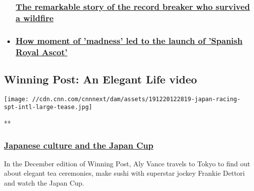 \begin{itemize}
{  \subsubsection{\texorpdfstring{\href{/2019/11/08/sport/belvoir-bay-fire-horse-california-winning-post-spt-intl/index.html}{The
  remarkable story of the record breaker who survived a
  wildfire}}{The remarkable story of the record breaker who survived a wildfire}}\label{the-remarkable-story-of-the-record-breaker-who-survived-a-wildfire}}
\item
  \hypertarget{how-moment-of-madness-led-to-the-launch-of-spanish-royal-ascot}{%
  \subsubsection{\texorpdfstring{\href{/2019/12/12/sport/spanish-royal-ascot-horse-racing/index.html}{How
  moment of 'madness' led to the launch of 'Spanish Royal
  Ascot'}}{How moment of 'madness' led to the launch of 'Spanish Royal Ascot'}}\label{how-moment-of-madness-led-to-the-launch-of-spanish-royal-ascot}}
\end{itemize}

\hypertarget{winning-post-an-elegant-life-video-}{%
\subsection{Winning Post: An Elegant Life
video~}\label{winning-post-an-elegant-life-video-}}

\href{/videos/sports/2020/01/03/japan-cup-sushi-tea-ceremonies-frankie-dettori-tokyo-winning-post-elegant-life-vision-spt-intl.cnn}{}

\texttt{[image: //cdn.cnn.com/cnnnext/dam/assets/191220122819-japan-racing-spt-intl-large-tease.jpg]}

**

\hypertarget{japanese-culture-and-the-japan-cup}{%
\subsubsection{\texorpdfstring{\href{/videos/sports/2020/01/03/japan-cup-sushi-tea-ceremonies-frankie-dettori-tokyo-winning-post-elegant-life-vision-spt-intl.cnn}{Japanese
culture and the Japan
Cup}}{Japanese culture and the Japan Cup}}\label{japanese-culture-and-the-japan-cup}}

In the December edition of Winning Post, Aly Vance travels to Tokyo to
find out about elegant tea ceremonies, make sushi with superstar jockey
Frankie Dettori and watch the Japan Cup.

